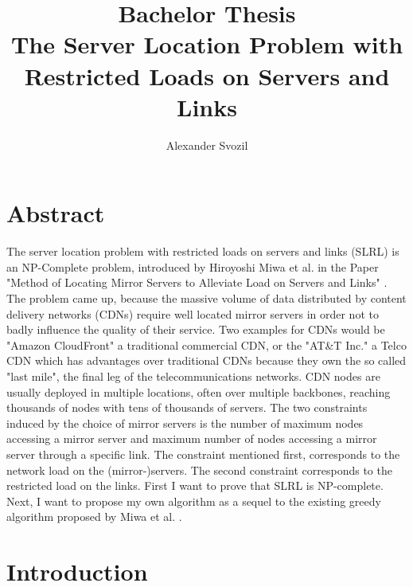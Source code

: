 \documentclass [12pt]{article}
\begin{document}
\author{Alexander Svozil}
\title{Bachelor Thesis \\ The Server Location Problem with Restricted Loads 
on Servers and Links}

\maketitle

\section{Abstract}
The server location problem with restricted loads on servers and links (SLRL) is an NP-Complete
problem, introduced by Hiroyoshi Miwa et al. in the Paper "Method of Locating Mirror Servers
to Alleviate Load on Servers and Links" \cite{mirrorserver}. The problem 
came up, because the massive volume of data distributed by content delivery networks (CDNs) 
require well located mirror servers in order not to badly influence the quality of their service.
Two examples for CDNs would be "Amazon CloudFront" a traditional commercial CDN, or the "AT\&T Inc."
a Telco CDN which has advantages over traditional CDNs because they own the so called "last mile",
the final leg of the telecommunications networks. CDN nodes are usually deployed in multiple 
locations, often over multiple backbones, reaching thousands of nodes with tens of thousands of 
servers. \cite{wiki:cdn} \cite{wiki:lastmile}
The two constraints induced by the choice of mirror servers is the number of maximum nodes
accessing a mirror server and maximum number of nodes accessing a mirror server 
through a specific link. The constraint mentioned first, corresponds to the network load on
the (mirror-)servers. The second constraint corresponds to the restricted load on the links.
First I want to prove that SLRL is NP-complete. Next, I want to propose my own algorithm as a
sequel to the existing greedy algorithm proposed by Miwa et al. \cite{mirrorserver}.


\tableofcontents

\section{Introduction}
\end{document}
